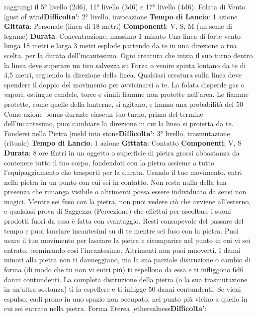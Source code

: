 \begin{multicols}{2}
raggiungi il 5° livello (2d6), 11° livello (3d6) e 17° livello
(4d6).
Folata di Vento
[gust of wind\textbf{Difficolta'}:
2° livello, invocazione
\textbf{Tempo di Lancio}: 1 azione
\textbf{Gittata}: Personale (linea di 18 metri)
\textbf{Componenti}: V, S, M (un seme di legume)
\textbf{Durata}: Concentrazione, massimo 1 minuto
Una linea di forte vento lunga 18 metri e larga 3 metri
esplode partendo da te in una direzione a tua scelta,
per la durata dell’incantesimo. Ogni creatura che inizia il
suo turno dentro la linea deve superare un tiro salvezza
su Forza o venire spinta lontano da te di 4,5 metri,
seguendo la direzione della linea.
Qualsiasi creatura sulla linea deve spendere il doppio
del movimento per avvicinarsi a te.
La folata disperde gas o vapori, estingue candele, torce
e simili fiamme non protette nell’area. Le fiamme
protette, come quelle della lanterne, si agitano, e hanno
una probabilità del 50%
Come azione bonus durante ciascun tuo turno, prima
del termine dell’incantesimo, puoi cambiare la direzione
in cui la linea si proietta da te.
Fondersi nella Pietra
[meld into stone\textbf{Difficolta'}:
3° livello, trasmutazione (rituale)
\textbf{Tempo di Lancio}: 1 azione
\textbf{Gittata}: Contatto
\textbf{Componenti}: V, S
\textbf{Durata}: 8 ore
Entri in un oggetto o superficie di pietra grossi
abbastanza da contenere tutto il tuo corpo, fondendoti
con la pietra assieme a tutto l’equipaggiamento che
trasporti per la durata. Usando il tuo movimento, entri
nella pietra in un punto con cui sei in contatto. Non
resta nulla della tua presenza che rimanga visibile o
altrimenti possa essere individuato da sensi non magici.
Mentre sei fuso con la pietra, non puoi vedere ciò che
avviene all’esterno, e qualsiasi prova di Saggezza
(Percezione) che effettui per ascoltare i suoni prodotti
fuori da essa è fatta con svantaggio. Resti consapevole
del passare del tempo e puoi lanciare incantesimi su di
te mentre sei fuso con la pietra. Puoi usare il tuo
movimento per lasciare la pietra e ricomparire nel punto
in cui vi sei entrato, terminando così l’incantesimo.
Altrimenti non puoi muoverti.
I danni minori alla pietra non ti danneggiano, ma la sua
parziale distruzione o cambio di forma (di modo che tu
non vi entri più) ti espellono da essa e ti infliggono 6d6
danni contundenti. La completa distruzione della pietra
(o la sua trasmutazione in un’altra sostanza) ti fa
espellere e ti infligge 50 danni contundenti. Se vieni
espulso, cadi prono in uno spazio non occupato, nel
punto più vicino a quello in cui sei entrato nella pietra.
Forma Eterea
[etherealness\textbf{Difficolta'}:

\end{multicols}
